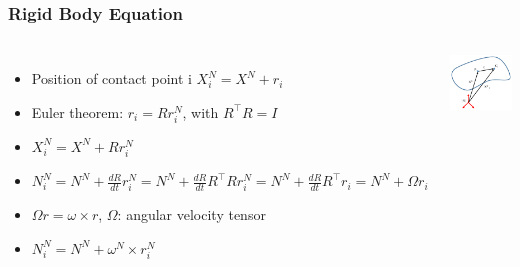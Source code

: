 \documentclass{beamer}
\begin{document}
\begin{frame}
\frametitle{Rigid Body Equation}
\begin{columns}[c] 

\begin{itemize}
\item Position of contact point i $X^{N}_{i}=X^N + r_{i}$ \vspace{.2cm}
\item Euler theorem: $r_{i} = Rr_{i}^{N}$, with $R^{\intercal}R=I$ \vspace{.2cm}
\item $X^{N}_{i}=X^N + Rr_{i}^{N}$ \vspace{.2cm}
\item $N^{N}_{i}=N^N + \frac{dR}{dt} r_{i}^{N}=N^N + \frac{dR}{dt} R^{\intercal}Rr_{i}^{N}=N^N + \frac{dR}{dt} R^{\intercal}r_{i}= N^N + \Omega r_{i}$ \vspace{.2cm}
\item $\Omega r=\omega\times r $, $\Omega$: angular velocity tensor \vspace{.2cm}
\item $N_{i}^{N}=N^N + \omega^N\times r_{i}^{N}$
\end{itemize}

\centering
 \includegraphics[width=1\textwidth]{figures/RigidBodyCrop.pdf}
\end{columns}
\end{frame}
\end{document}
